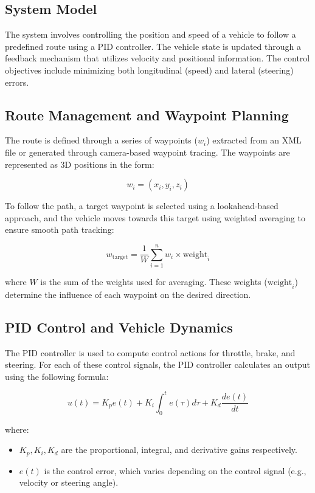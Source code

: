 \documentclass[conference]{IEEEtran}
\begin{document}
\subsection{System Model}

The system involves controlling the position and speed of a vehicle to follow a predefined route using a PID controller. The vehicle state is updated through a feedback mechanism that utilizes velocity and positional information. The control objectives include minimizing both longitudinal (speed) and lateral (steering) errors.

\subsection{Route Management and Waypoint Planning}
The route is defined through a series of waypoints ($w_i$) extracted from an XML file or generated through camera-based waypoint tracing. The waypoints are represented as 3D positions in the form:

\begin{equation}
w_i = (x_i, y_i, z_i)
\end{equation}

To follow the path, a target waypoint is selected using a lookahead-based approach, and the vehicle moves towards this target using weighted averaging to ensure smooth path tracking:

\begin{equation}
w_{\text{target}} = \frac{1}{W} \sum_{i=1}^{n} w_i \times \text{weight}_i
\end{equation}

where $W$ is the sum of the weights used for averaging. These weights ($\text{weight}_i$) determine the influence of each waypoint on the desired direction.

\subsection{PID Control and Vehicle Dynamics}
The PID controller is used to compute control actions for throttle, brake, and steering. For each of these control signals, the PID controller calculates an output using the following formula:

\begin{equation}
u(t) = K_p e(t) + K_i \int_{0}^{t} e(\tau) d\tau + K_d \frac{de(t)}{dt}
\end{equation}

where:
\begin{itemize}
    \item $K_p, K_i, K_d$ are the proportional, integral, and derivative gains respectively.
    \item $e(t)$ is the control error, which varies depending on the control signal (e.g., velocity or steering angle).
\end{itemize}
\end{document}

